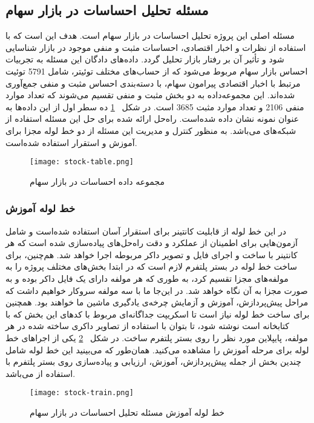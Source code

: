 \subsection{مسئله تحلیل احساسات در بازار سهام}

مسئله اصلی این پروژه تحلیل احساسات در بازار سهام است. هدف این است که با استفاده از نظرات و اخبار اقتصادی، احساسات مثبت و منفی موجود در بازار شناسایی شود و تأثیر آن بر رفتار بازار تحلیل گردد. داده‌های دادگان این مسئله به تجربیات احساس بازار سهام مربوط می‌شود که از حساب‌های مختلف توئیتر، شامل 5791 توئیت مرتبط با اخبار اقتصادی پیرامون سهام، با دسته‌بندی احساس مثبت و منفی جمع‌آوری شده‌اند. این مجموعه‌داده به دو بخش مثبت و منفی تقسیم می‌شوند که تعداد موارد منفی 2106 و تعداد موارد مثبت 3685 است. در شکل 
~\ref{fig: stock data}
ده سطر اول از این داده‌ها به عنوان نمونه نشان داده شده‌است. راه‌حل ارائه شده برای حل این مسئله استفاده از شبکه‌های  می‌باشد. به منظور کنترل و مدیریت این مسئله از دو خط لوله مجزا برای آموزش و استقرار استفاده شده‌است. 
\begin{figure}[!b]
	\centering
	\texttt{[image: stock-table.png]}
	\caption{مجموعه داده احساسات در بازار سهام}
	\label{fig: stock data}
\end{figure}

\subsubsection{خط لوله آموزش}
در این خط لوله از قابلیت کانتینر برای استقرار آسان استفاده شده‌است و شامل آزمون‌هایی برای اطمینان از عملکرد و دقت راه‌حل‌های پیاده‌سازی شده است که هر کانتینر با ساخت و اجرای فایل و تصویر داکر مربوطه اجرا خواهد شد. هم‌چنین،‌ برای ساخت خط لوله در بستر پلتفرم لازم است که در ابتدا بخش‌های مختلف پروژه را به مولفه‌های مجزا تقسیم کرد، به طوری که هر مولفه دارای یک فایل داکر بوده و به صورت مجزا به آن نگاه خواهد شد. در این‌جا ما با سه مولفه سروکار خواهیم داشت که مراحل پیش‌پردازش، آموزش و آزمایش چرخه‌ی یادگیری ماشین ما خواهند بود. همچنین برای ساخت خط لوله نیاز است تا اسکریپت جداگانه‌ای مربوط با کدهای این بخش که با کتابخانه  است نوشته شود، تا بتوان با استفاده از تصاویر داکری ساخته شده در هر مولفه، پایپلاین مورد نظر را روی بستر پلتفرم  ساخت. در شکل 
~\ref{fig: stock train}
یکی از اجراهای خط لوله  برای مرحله آموزش را مشاهده می‌کنید. همان‌طور که می‌بینید این خط لوله شامل چندین بخش از جمله پیش‌پردازش،‌ آموزش،‌ ارزیابی و پیاده‌سازی روی بستر پلتفرم  با استفاده از  می‌باشد.
\begin{figure}[!t]
	\centering
	\texttt{[image: stock-train.png]}
	\caption{خط لوله آموزش مسئله تحلیل احساسات در بازار سهام}
	\label{fig: stock train}
\end{figure}

